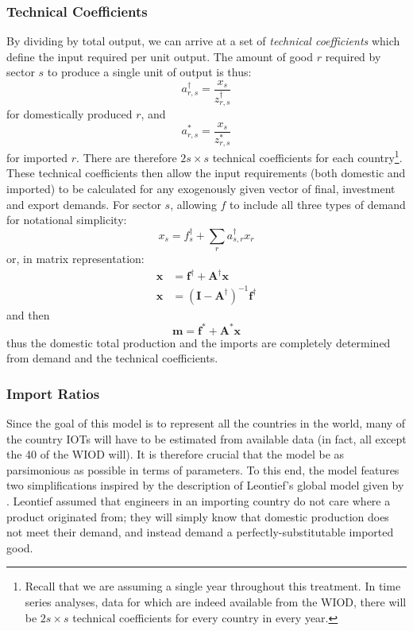 \documentclass[a4paper]{article}
\begin{document}
\subsubsection*{Technical Coefficients}\label{sec:techcoeffs}
By dividing by total output, we can arrive at a set of \textit{technical coefficients} which define the input required per unit output.
The amount of good $r$ required by sector $s$ to produce a single unit of output is thus:
\begin{equation}\label{eq:adagger}
a_{r,s}^\dagger = \frac{x_s}{z^\dagger_{r,s}}
\end{equation}
for domestically produced $r$, and
\begin{equation}\label{eq:astar}
a_{r,s}^* = \frac{x_s}{z^*_{r,s}}
\end{equation}
for imported $r$. There are therefore $2s \times s$ technical coefficients for each country\footnote{Recall that we are assuming a single year throughout this treatment.
In time series analyses, data for which are indeed available from the WIOD, there will be $2s \times s$ technical coefficients for every country in every year.}.
These technical coefficients then allow the input requirements (both domestic and imported) to be calculated for any exogenously given vector of final, investment and export demands. For sector $s$, allowing $f$ to include all three types of demand for notational simplicity:
$$
x_s = f^\dagger_s + \sum_r{a^\dagger_{s,r}x_r}
$$
or, in matrix representation:
\begin{align}
\boldsymbol{x}& = \boldsymbol{f^\dagger} 
+ \boldsymbol{A^\dagger}\boldsymbol{x} \nonumber\\
\boldsymbol{x}& = (\boldsymbol{I} - \boldsymbol{A^\dagger})^{-1} 
\boldsymbol{f^\dagger}\label{eqn:xIRIO}
\end{align}
and then
\begin{equation}\label{eqn:mIRIO}
\boldsymbol{m} = \boldsymbol{f^*} 
+ \boldsymbol{A^*}\boldsymbol{x}
\end{equation}
thus the domestic total production and the imports are completely determined from demand and the technical coefficients.

\subsubsection*{Import Ratios}\label{sec:importratios}
Since the goal of this model is to represent all the countries in the world, many of the country IOTs will have to be estimated from available data (in fact, all except the 40 of the WIOD will).
It is therefore crucial that the model be as parsimonious as possible in terms of parameters.
To this end, the model features two simplifications inspired by the description of Leontief's global model given by \textcite{Duchin2004}.
Leontief assumed that engineers in an importing country do not care where a product originated from; they will simply know that domestic production does not meet their demand, and instead demand a perfectly-substitutable imported good.
\end{document}

